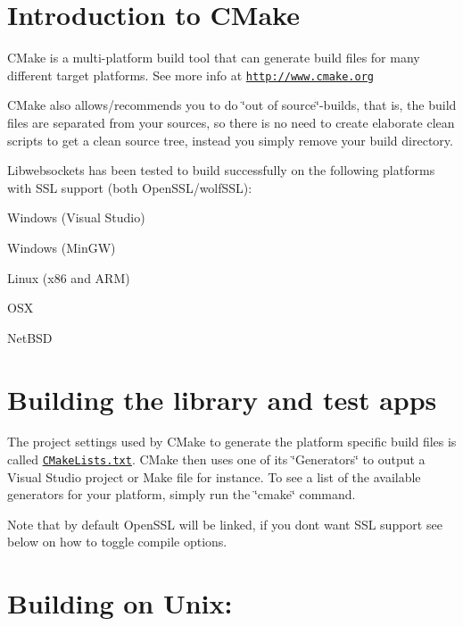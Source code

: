 \hypertarget{md_README.build_cm}{}\section{Introduction to C\+Make}\label{md_README.build_cm}
C\+Make is a multi-\/platform build tool that can generate build files for many different target platforms. See more info at \href{http://www.cmake.org}{\tt http\+://www.\+cmake.\+org}

C\+Make also allows/recommends you to do \char`\"{}out of source\char`\"{}-\/builds, that is, the build files are separated from your sources, so there is no need to create elaborate clean scripts to get a clean source tree, instead you simply remove your build directory.

Libwebsockets has been tested to build successfully on the following platforms with S\+SL support (both Open\+S\+S\+L/wolf\+S\+SL)\+:


\begin{DoxyItemize}
\item Windows (Visual Studio)
\item Windows (Min\+GW)
\item Linux (x86 and A\+RM)
\item O\+SX
\item Net\+B\+SD
\end{DoxyItemize}\hypertarget{md_README.build_build1}{}\section{Building the library and test apps}\label{md_README.build_build1}
The project settings used by C\+Make to generate the platform specific build files is called \href{CMakeLists.txt}{\tt C\+Make\+Lists.\+txt}. C\+Make then uses one of its \char`\"{}\+Generators\char`\"{} to output a Visual Studio project or Make file for instance. To see a list of the available generators for your platform, simply run the \char`\"{}cmake\char`\"{} command.

Note that by default Open\+S\+SL will be linked, if you don\textquotesingle{}t want S\+SL support see below on how to toggle compile options.\hypertarget{md_README.build_bu}{}\section{Building on Unix\+:}\label{md_README.build_bu}

